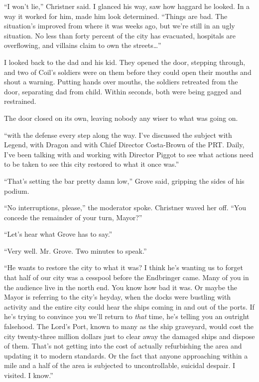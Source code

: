 ``I won't lie,'' Christner said.  I glanced his way, saw how haggard he looked.  In a way it worked for him, made him look determined.  ``Things are bad.  The situation's improved from where it was weeks ago, but we're still in an ugly situation.  No less than forty percent of the city has evacuated, hospitals are overflowing, and villains claim to own the streets\ldots''



I looked back to the dad and his kid.  They opened the door, stepping through, and two of Coil's soldiers were on them before they could open their mouths and shout a warning.  Putting hands over mouths, the soldiers retreated from the door, separating dad from child.  Within seconds, both were being gagged and restrained.



The door closed on its own, leaving nobody any wiser to what was going on.



``\ldotsinvolved with the defense every step along the way.  I've discussed the subject with Legend, with Dragon and with Chief Director Costa-Brown of the PRT.  Daily, I've been talking with and working with Director Piggot to see what actions need to be taken to see this city restored to what it once was.''



``That's setting the bar pretty damn low,'' Grove said, gripping the sides of his podium.



``No interruptions, please,'' the moderator spoke.  Christner waved her off.  ``You concede the remainder of your turn, Mayor?''



``Let's hear what Grove has to say.''



``Very well.  Mr. Grove.  Two minutes to speak.''



``He wants to restore the city to what it was?  I think he's wanting us to forget that half of our city was a cesspool before the Endbringer came.  Many of you in the audience live in the north end.  You know how bad it was.  Or maybe the Mayor is referring to the city's heyday, when the docks were bustling with activity and the entire city could hear the ships coming in and out of the ports.  If he's trying to convince you we'll return to \emph{that} time, he's telling you an outright falsehood.  The Lord's Port, known to many as the ship graveyard, would cost the city twenty-three million dollars just to clear away the damaged ships and dispose of them.    That's not getting into the cost of actually refurbishing the area and updating it to modern standards.  Or the fact that anyone approaching within a mile and a half of the area is subjected to uncontrollable, suicidal despair.  I visited.  I know.''



